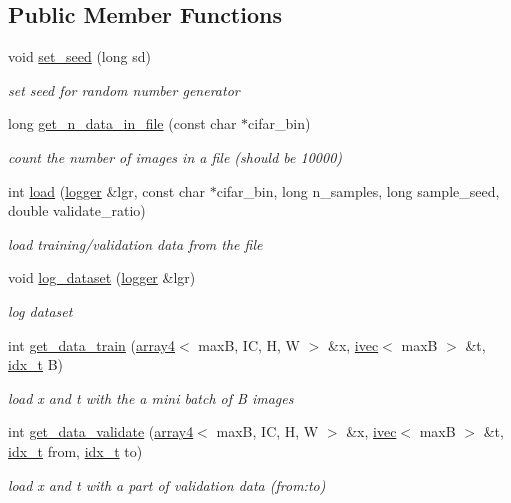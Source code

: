 \subsection*{Public Member Functions}
\begin{DoxyCompactItemize}
\item 
void \hyperlink{structcifar10__dataset_a90bb8f4e440939589db017dbc89004c4}{set\+\_\+seed} (long sd)
\begin{DoxyCompactList}\small\item\em set seed for random number generator \end{DoxyCompactList}\item 
long \hyperlink{structcifar10__dataset_ad0025b0632ecfa9810d8a7c99d279f51}{get\+\_\+n\+\_\+data\+\_\+in\+\_\+file} (const char $\ast$cifar\+\_\+bin)
\begin{DoxyCompactList}\small\item\em count the number of images in a file (should be 10000) \end{DoxyCompactList}\item 
int \hyperlink{structcifar10__dataset_a4574eb110a71faac0e38445fd7be6fd2}{load} (\hyperlink{structlogger}{logger} \&lgr, const char $\ast$cifar\+\_\+bin, long n\+\_\+samples, long sample\+\_\+seed, double validate\+\_\+ratio)
\begin{DoxyCompactList}\small\item\em load training/validation data from the file \end{DoxyCompactList}\item 
void \hyperlink{structcifar10__dataset_acaa1adc9988bbb59550f778b82026ff8}{log\+\_\+dataset} (\hyperlink{structlogger}{logger} \&lgr)
\begin{DoxyCompactList}\small\item\em log dataset \end{DoxyCompactList}\item 
int \hyperlink{structcifar10__dataset_afafc5833390f1f3f9c2fefea15d643ca}{get\+\_\+data\+\_\+train} (\hyperlink{structarray4}{array4}$<$ maxB, IC, H, W $>$ \&x, \hyperlink{structivec}{ivec}$<$ maxB $>$ \&t, \hyperlink{vgg__util_8h_a8e93478a00e685bea5e6a3f617bf03a3}{idx\+\_\+t} B)
\begin{DoxyCompactList}\small\item\em load x and t with the a mini batch of B images \end{DoxyCompactList}\item 
int \hyperlink{structcifar10__dataset_a4176a67684d105dac1c95a1556761173}{get\+\_\+data\+\_\+validate} (\hyperlink{structarray4}{array4}$<$ maxB, IC, H, W $>$ \&x, \hyperlink{structivec}{ivec}$<$ maxB $>$ \&t, \hyperlink{vgg__util_8h_a8e93478a00e685bea5e6a3f617bf03a3}{idx\+\_\+t} from, \hyperlink{vgg__util_8h_a8e93478a00e685bea5e6a3f617bf03a3}{idx\+\_\+t} to)
\begin{DoxyCompactList}\small\item\em load x and t with a part of validation data (from\+:to) \end{DoxyCompactList}\end{DoxyCompactItemize}

